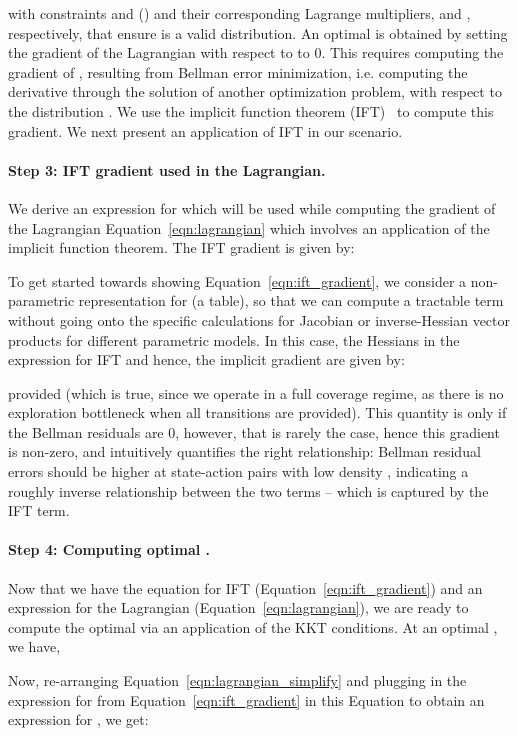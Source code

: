 \documentclass[jmlr]{article}
\begin{document}
with constraints  and  () and their corresponding Lagrange multipliers,  and , respectively, that ensure  is a valid distribution.
An optimal  is obtained by setting the gradient of the Lagrangian with respect to  to 0. This requires computing the gradient of , resulting from Bellman error minimization, i.e. computing the derivative through the solution of another optimization problem,  with respect to the distribution . We use the implicit function theorem (IFT)~\citep{Krantz2002TheIF} to compute this gradient. We next present an application of IFT in our scenario.

\paragraph{Step 3: IFT gradient used in the Lagrangian.} We derive an expression for  which will be used while computing the gradient of the Lagrangian Equation~\ref{eqn:lagrangian} which involves an application of the implicit function theorem. The IFT gradient is given by: 

To get started towards showing Equation~\ref{eqn:ift_gradient}, we consider a non-parametric representation for  (a table), so that we can compute a tractable term without going onto the specific calculations for Jacobian or inverse-Hessian vector products for different parametric models. In this case, the Hessians in the expression for IFT and hence, the implicit gradient are given by:

provided  (which is true, since we operate in a full coverage regime, as there is no exploration bottleneck when all transitions are provided). This quantity is  only if the Bellman residuals  are 0, however, that is rarely the case, hence this gradient is non-zero, and intuitively quantifies the right relationship: Bellman residual errors  should be higher at state-action pairs with low density , indicating a roughly inverse relationship between the two terms -- which is captured by the IFT term. 



\paragraph{Step 4: Computing optimal .} Now that we have the equation for IFT (Equation~\ref{eqn:ift_gradient}) and an expression for the Lagrangian (Equation~\ref{eqn:lagrangian}), we are ready to compute the optimal  via an application of the KKT conditions. At an optimal , we have, 

Now, re-arranging Equation~\ref{eqn:lagrangian_simplify} and plugging in the expression for  from Equation~\ref{eqn:ift_gradient} in this Equation to obtain an expression for , we get:
\end{document}
